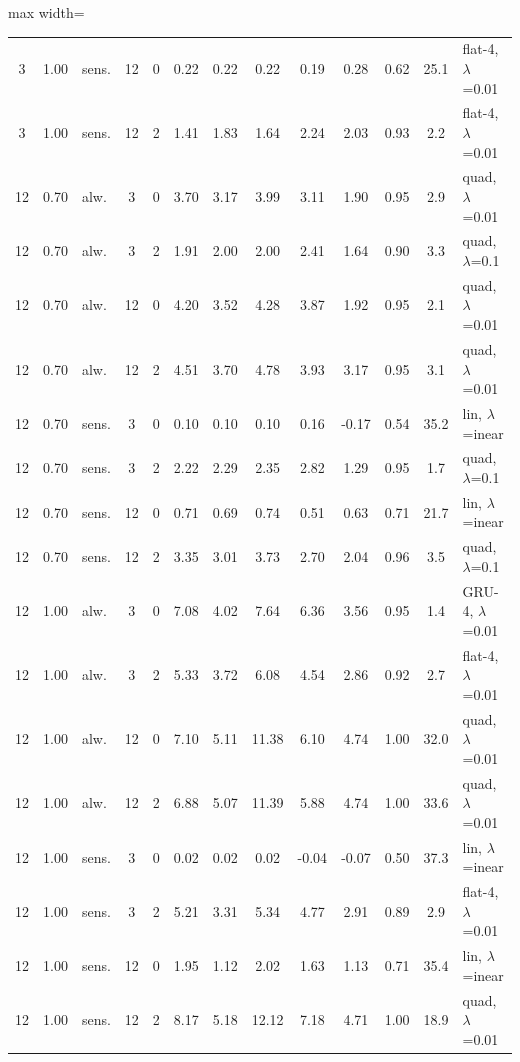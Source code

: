 \documentclass[10pt]{article}
\begin{document}
\begin{table}[htbp]
\begin{adjustbox}{max width=\textwidth}
\begin{tabular}{cclcc cccc c cc l}
3 & 1.00 & sens. & 12 & 0 & 0.22 & 0.22 & 0.22 & 0.19 & 0.28 & 0.62 & 25.1 & flat-4, $\lambda$=0.01 \\
3 & 1.00 & sens. & 12 & 2 & 1.41 & 1.83 & 1.64 & 2.24 & 2.03 & 0.93 & 2.2 & flat-4, $\lambda$=0.01 \\
12 & 0.70 & alw. & 3 & 0 & 3.70 & 3.17 & 3.99 & 3.11 & 1.90 & 0.95 & 2.9 & quad, $\lambda$=0.01 \\
12 & 0.70 & alw. & 3 & 2 & 1.91 & 2.00 & 2.00 & 2.41 & 1.64 & 0.90 & 3.3 & quad, $\lambda$=0.1 \\
12 & 0.70 & alw. & 12 & 0 & 4.20 & 3.52 & 4.28 & 3.87 & 1.92 & 0.95 & 2.1 & quad, $\lambda$=0.01 \\
12 & 0.70 & alw. & 12 & 2 & 4.51 & 3.70 & 4.78 & 3.93 & 3.17 & 0.95 & 3.1 & quad, $\lambda$=0.01 \\
12 & 0.70 & sens. & 3 & 0 & 0.10 & 0.10 & 0.10 & 0.16 & -0.17 & 0.54 & 35.2 & lin, $\lambda$=inear \\
12 & 0.70 & sens. & 3 & 2 & 2.22 & 2.29 & 2.35 & 2.82 & 1.29 & 0.95 & 1.7 & quad, $\lambda$=0.1 \\
12 & 0.70 & sens. & 12 & 0 & 0.71 & 0.69 & 0.74 & 0.51 & 0.63 & 0.71 & 21.7 & lin, $\lambda$=inear \\
12 & 0.70 & sens. & 12 & 2 & 3.35 & 3.01 & 3.73 & 2.70 & 2.04 & 0.96 & 3.5 & quad, $\lambda$=0.1 \\
12 & 1.00 & alw. & 3 & 0 & 7.08 & 4.02 & 7.64 & 6.36 & 3.56 & 0.95 & 1.4 & GRU-4, $\lambda$=0.01 \\
12 & 1.00 & alw. & 3 & 2 & 5.33 & 3.72 & 6.08 & 4.54 & 2.86 & 0.92 & 2.7 & flat-4, $\lambda$=0.01 \\
12 & 1.00 & alw. & 12 & 0 & 7.10 & 5.11 & 11.38 & 6.10 & 4.74 & 1.00 & 32.0 & quad, $\lambda$=0.01 \\
12 & 1.00 & alw. & 12 & 2 & 6.88 & 5.07 & 11.39 & 5.88 & 4.74 & 1.00 & 33.6 & quad, $\lambda$=0.01 \\
12 & 1.00 & sens. & 3 & 0 & 0.02 & 0.02 & 0.02 & -0.04 & -0.07 & 0.50 & 37.3 & lin, $\lambda$=inear \\
12 & 1.00 & sens. & 3 & 2 & 5.21 & 3.31 & 5.34 & 4.77 & 2.91 & 0.89 & 2.9 & flat-4, $\lambda$=0.01 \\
12 & 1.00 & sens. & 12 & 0 & 1.95 & 1.12 & 2.02 & 1.63 & 1.13 & 0.71 & 35.4 & lin, $\lambda$=inear \\
12 & 1.00 & sens. & 12 & 2 & 8.17 & 5.18 & 12.12 & 7.18 & 4.71 & 1.00 & 18.9 & quad, $\lambda$=0.01 \\
\bottomrule
\end{tabular}
\end{adjustbox}
\end{table}
\end{document}
